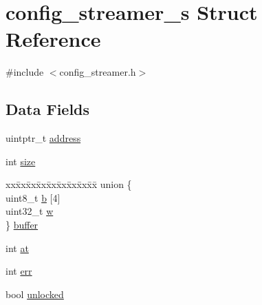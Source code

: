 \hypertarget{structconfig__streamer__s}{\section{config\+\_\+streamer\+\_\+s Struct Reference}
\label{structconfig__streamer__s}
}


{\ttfamily \#include $<$config\+\_\+streamer.\+h$>$}

\subsection*{Data Fields}
\begin{DoxyCompactItemize}
\item 
uintptr\+\_\+t \hyperlink{structconfig__streamer__s_ac169128289ab74e9513965e4cbdd5ef4}{address}
\item 
int \hyperlink{structconfig__streamer__s_a571ba2b6208f4365182a4d736da5b533}{size}
\item 
\begin{tabbing}
xx\=xx\=xx\=xx\=xx\=xx\=xx\=xx\=xx\=\kill
union \{\\
\>uint8\_t \hyperlink{structconfig__streamer__s_a305ff46c465ee1b7546c59d68d1e8ad8}{b} \mbox{[}4\mbox{]}\\
\>uint32\_t \hyperlink{structconfig__streamer__s_aabb0121c5cb2ac2b89c03ca710b27794}{w}\\
\} \hyperlink{structconfig__streamer__s_aefe32960613d725ad2435db7c784cae3}{buffer}\\

\end{tabbing}\item 
int \hyperlink{structconfig__streamer__s_a1664cca3d1c72e9fcda387047cda68ce}{at}
\item 
int \hyperlink{structconfig__streamer__s_a40ddfcafe84421f395f76c8d59248f97}{err}
\item 
bool \hyperlink{structconfig__streamer__s_a7e4cec097eada23b105f9720cc7bebe5}{unlocked}
\end{DoxyCompactItemize}


